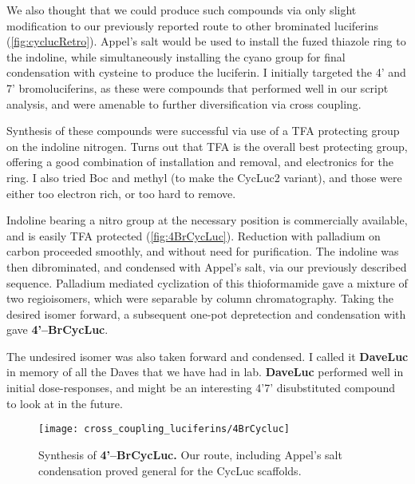 We also thought that we could produce such compounds via only slight modification to our previously reported route to other brominated luciferins (\autoref{fig:cyclucRetro}).\cite{SteinhardtBrominatedLuciferinsAre2016}
Appel's salt would be used to install the fuzed thiazole ring to the indoline, while simultaneously installing the cyano group for final condensation with cysteine to produce the luciferin.
I initially targeted the 4' and 7' bromoluciferins, as these were compounds that performed well in our script analysis, and were amenable to further diversification via cross coupling.
\begin{thoughts}
  Synthesis of these compounds were successful via use of a TFA protecting group on the indoline nitrogen. Turns out that TFA is the overall best protecting group, offering a good combination of installation and removal, and electronics for the ring. I also tried Boc and methyl (to make the CycLuc2 variant), and those were either too electron rich, or too hard to remove.
\end{thoughts}
Indoline bearing a nitro group at the necessary position is commercially available, and is easily TFA protected (\autoref{fig:4BrCycLuc}).\cite{ReddyRobustlightemission2010,MoffordAminoluciferinsExtendFirefly2014}
Reduction with palladium on carbon proceeded smoothly, and without need for purification.
The indoline was then dibrominated, and condensed with Appel's salt, via our previously described sequence.\cite{SteinhardtBrominatedLuciferinsAre2016}
Palladium mediated cyclization of this thioformamide gave a mixture of two regioisomers, which were separable by column chromatography.
Taking the desired isomer forward, a subsequent one-pot depretection and condensation with \Dcys{} gave \textbf{4'--BrCycLuc}.
\begin{thoughts}
  The undesired isomer was also taken forward and condensed. I called it \textbf{DaveLuc} in memory of all the Daves that we have had in lab. \textbf{DaveLuc} performed well in initial dose-responses, and might be an interesting 4'7' disubstituted compound to look at in the future.
\end{thoughts}

\begin{figure}[htbp]
\texttt{[image: cross\_coupling\_luciferins/4BrCycluc]} %
\centering
\caption[Synthesis of \textbf{4'--BrCycLuc.}]{
Synthesis of \textbf{4'--BrCycLuc.} Our route, including Appel's salt condensation proved general for the CycLuc scaffolds.
}
  \label{fig:4BrCycLuc}
\end{figure}

